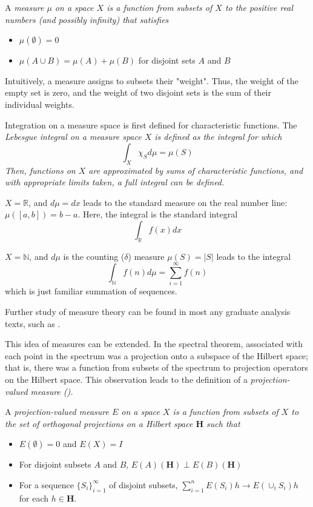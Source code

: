 A \em measure \em $\mu$ on a space $X$ is a function from subsets of $X$ to the
positive real numbers (and possibly infinity) that satisfies
\begin{itemize}
    \itemsep0em
    \item $\mu(\emptyset) = 0$
    \item $\mu(A\cup B) = \mu(A) + \mu(B)$ for disjoint sets $A$ and $B$
\end{itemize}

Intuitively, a measure assigns to subsets their "weight". Thus, the weight of
the empty set is zero, and the weight of two disjoint sets is the sum of their
individual weights.

Integration on a measure space is first defined for characteristic functions.
The \em Lebesgue integral \em on a measure space $X$ is defined as the integral
for which
\[
    \int_X \chi_S d\mu = \mu(S)
\]
Then, functions on $X$ are approximated by sums of characteristic functions, and
with appropriate limits taken, a full integral can be defined.


    \begin{example}
        $X = \mathbb{R}$, and $d\mu = dx$ leads to the standard measure on the
        real number line: $\mu([a,b]) = b-a$. Here, the integral is the standard
        integral
            \[
                \int_{\mathbb{R}}f(x)dx
            \]
    \end{example}


    \begin{example}
        $X = \mathbb{N}$, and $d\mu$ is the counting ($\delta$) measure $\mu(S)
        = |S|$ leads to the integral
        \[
            \int_{\mathbb{N}}f(n)d\mu = \sum_{i=1}^{\infty}f(n)
        \]
        which is just familiar summation of sequences.
    \end{example}
    Further study of measure theory can be found in most any graduate analysis
    texts, such as \cite{Lang1993}.


This idea of measures can be extended. In the spectral theorem, associated with
each point in the spectrum was a projection onto a subspace of the Hilbert
space; that is, there was a function from subsets of the spectrum to projection
operators on the Hilbert space. This observation leads to the definition of a
\em projection-valued measure \em (\cite[Ch. 6.2]{MacCluer2009}).
\begin{definition}
    A \em projection-valued measure \em $E$ on a space $X$ is a function from
    subsets of $X$ to the set of orthogonal projections on a Hilbert space
    $\textbf{H}$ such that
    \begin{itemize}
        \itemsep0em
        \item $E(\emptyset)=0$ and $E(X) = I$
        \item For disjoint subsets $A$ and $B$, $E(A)(\textbf{H})\perp
            E(B)(\textbf{H})$
        \item For a sequence $\{S_i\}_{i=1}^{\infty}$ of disjoint subsets,
            $\sum_{i=1}^nE(S_i)h \to E(\cup_i S_i)h$ for each $h\in\textbf{H}$.
    \end{itemize}
\end{definition}

